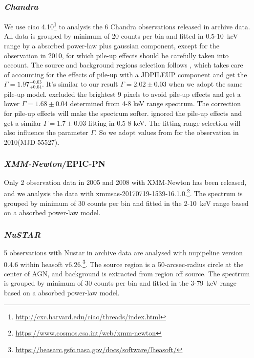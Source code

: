 \documentclass[twocolumn]{aastex63}
\newcommand{\xmm}{{\em XMM-Newton}}
\newcommand{\nustar}{{\em NuSTAR}}
\newcommand{\chandra}{{\em Chandra}}
\begin{document}
\subsubsection{\chandra}
We use ciao 4.10\footnote{\url{http://cxc.harvard.edu/ciao/threads/index.html}} to analysis the 6 Chandra observations released in archive data. All data is grouped by minimum of 20 counts per bin and fitted in 0.5-10~keV range by a absorbed power-law plus gaussian component, except for the observation in 2010, for which pile-up effects should be carefully taken into account. The source and background regions selection follows \citet{2017ApJ...840...11L}, which takes care of accounting for the effects of pile-up with a JDPILEUP component and get the  $\Gamma =1.97_{+0.04}^{-0.03}$. It's similar to our result $\Gamma =2.02\pm{0.03}$ when we adopt the same pile-up model. \citet{2016A&A...593L...9H} excluded the brightest 9 pixels to avoid pile-up effects and get a lower $\Gamma =1.68\pm0.04$ determined from 4-8 keV range spectrum. The correction for pile-up effects will make the spectrum softer. \citet{2017A&A...607L...9K} ignored the pile-up effects and get a similar $\Gamma =1.7\pm0.03$ fitting in 0.5-8 keV. The fitting range selection will also influence the parameter $\Gamma$. So we adopt values from \citet{2017A&A...607L...9K} for the observation in 2010(MJD 55527).

\subsubsection{\xmm/EPIC-PN}
Only 2 observation data in 2005 and 2008 with XMM-Newton has been released, and we analysis the data with xmmsas-20170719-1539-16.1.0.\footnote{\url{https://www.cosmos.esa.int/web/xmm-newton}}. The spectrum is grouped by minimum of 30 counts per bin and fitted in the 2-10~keV range based on a absorbed power-law model. 

\subsubsection{\nustar}
5 observations with Nustar in archive data are analysed with nupipeline version 0.4.6 within heasoft v6.26.\footnote{\url{https://heasarc.gsfc.nasa.gov/docs/software/lheasoft/}}. The source region is a 50-arcsec-radius circle at the center of AGN, and background is extracted from region off source. The spectrum is grouped by minimum of 30 counts per bin and fitted in the 3-79~keV range based on a absorbed power-law model.
\end{document}
